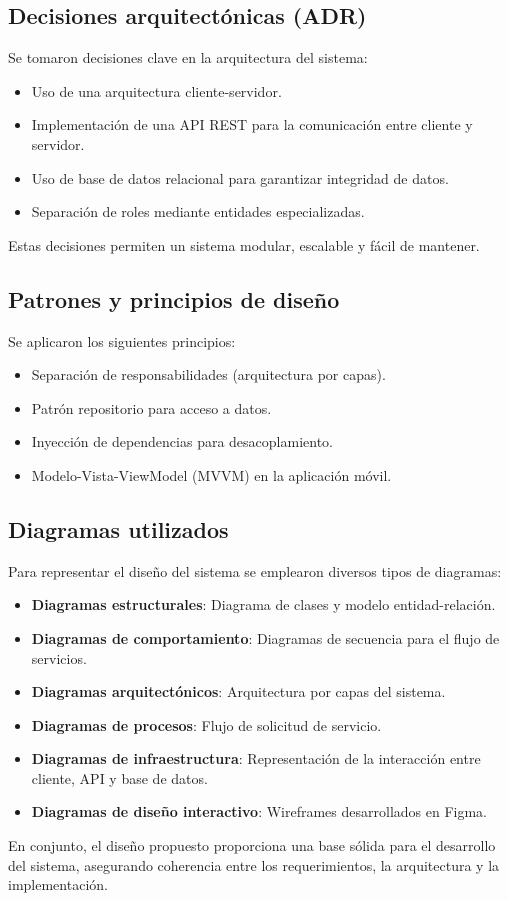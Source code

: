 \subsection*{Decisiones arquitectónicas (ADR)}

Se tomaron decisiones clave en la arquitectura del sistema:

\begin{itemize}
    \item Uso de una arquitectura cliente-servidor.
    \item Implementación de una API REST para la comunicación entre cliente y servidor.
    \item Uso de base de datos relacional para garantizar integridad de datos.
    \item Separación de roles mediante entidades especializadas.
\end{itemize}

Estas decisiones permiten un sistema modular, escalable y fácil de mantener.

\subsection*{Patrones y principios de diseño}

Se aplicaron los siguientes principios:

\begin{itemize}
    \item Separación de responsabilidades (arquitectura por capas).
    \item Patrón repositorio para acceso a datos.
    \item Inyección de dependencias para desacoplamiento.
    \item Modelo-Vista-ViewModel (MVVM) en la aplicación móvil.
\end{itemize}

\subsection*{Diagramas utilizados}

Para representar el diseño del sistema se emplearon diversos tipos de diagramas:

\begin{itemize}
    \item \textbf{Diagramas estructurales}: Diagrama de clases y modelo entidad-relación.
    \item \textbf{Diagramas de comportamiento}: Diagramas de secuencia para el flujo de servicios.
    \item \textbf{Diagramas arquitectónicos}: Arquitectura por capas del sistema.
    \item \textbf{Diagramas de procesos}: Flujo de solicitud de servicio.
    \item \textbf{Diagramas de infraestructura}: Representación de la interacción entre cliente, API y base de datos.
    \item \textbf{Diagramas de diseño interactivo}: Wireframes desarrollados en Figma.
\end{itemize}

En conjunto, el diseño propuesto proporciona una base sólida para el desarrollo del sistema, asegurando coherencia entre los requerimientos, la arquitectura y la implementación.